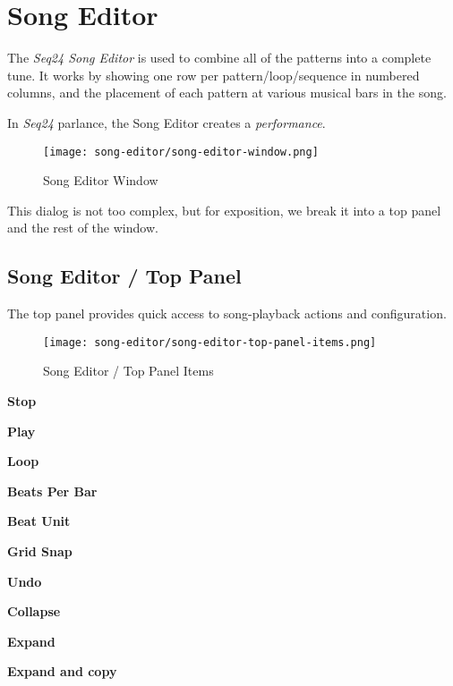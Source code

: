 %
%
%

\section{Song Editor}
\label{sec:seq24_song_editor}

   The \textsl{Seq24 Song Editor} is used to combine all of the patterns
   into a complete tune.  It works by showing one row per
   pattern/loop/sequence in numbered columns, and the placement of each
   pattern at various musical bars in the song.

   In \textsl{Seq24} parlance, the Song Editor creates a
   \textsl{performance}.

\begin{figure}[H]
   \centering 
   \texttt{[image: song-editor/song-editor-window.png]}
   \caption{Song Editor Window}
   \label{fig:song_editor_window}
\end{figure}

   This dialog is not too complex, but
   for exposition, we break it into a top panel and the rest of the window.

\subsection{Song Editor / Top Panel}
\label{subsec:seq24_song_editor_top}

   The top panel provides quick access to song-playback actions and
   configuration.

\begin{figure}[H]
   \centering 
   \texttt{[image: song-editor/song-editor-top-panel-items.png]}
   \caption{Song Editor / Top Panel Items}
   \label{fig:song_editor_top_panel_items}
\end{figure}

   \begin{enumber}
      \item \textbf{Stop}
      \item \textbf{Play}
      \item \textbf{Loop}
      \item \textbf{Beats Per Bar}
      \item \textbf{Beat Unit}
      \item \textbf{Grid Snap}
      \item \textbf{Undo}
      \item \textbf{Collapse}
      \item \textbf{Expand}
      \item \textbf{Expand and copy}
   \end{enumber}

